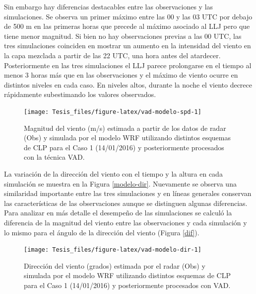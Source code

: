 \documentclass[12pt,spanish,oneside, a4paper]{book}
\begin{document}
Sin embargo hay diferencias destacables entre las observaciones y las
simulaciones. Se observa un primer máximo entre las 00 y las 03 UTC por
debajo de 500 m en las primeras horas que precede al máximo asociado al
LLJ pero que tiene menor magnitud. Si bien no hay observaciones previas
a las 00 UTC, las tres simulaciones coinciden en mostrar un aumento en
la intensidad del viento en la capa mezclada a partir de las 22 UTC, una
hora antes del atardecer. Posteriormente en las tres simulaciones el LLJ
parece prolongarse en el tiempo al menos 3 horas más que en las
observaciones y el máximo de viento ocurre en distintos niveles en cada
caso. En niveles altos, durante la noche el viento decrece rápidamente
subestimando los valores observados.

\begin{figure}

{\centering \texttt{[image: Tesis\_files/figure-latex/vad-modelo-spd-1]} 

}

\caption{Magnitud del viento (m/s) estimada a partir de los datos de radar (Obs) y simulada por el modelo WRF utilizando distintos esquemas de CLP para el Caso 1 (14/01/2016) y posteriormente procesados con la técnica VAD. \label{modelo-spd}}\label{fig:vad-modelo-spd}
\end{figure}

La variación de la dirección del viento con el tiempo y la altura en
cada simulación se muestra en la Figura \ref{modelo-dir}. Nuevamente se
observa una similaridad importante entre las tres simulaciones y en
líneas generales conservan las características de las observaciones
aunque se distinguen algunas diferencias. Para analizar en más detalle
el desempeño de las simulaciones se calculó la diferencia de la magnitud
del viento entre las observaciones y cada simulación y lo mismo para el
ángulo de la dirección del viento (Figura \ref{dif}).

\begin{figure}

{\centering \texttt{[image: Tesis\_files/figure-latex/vad-modelo-dir-1]} 

}

\caption{Dirección del viento (grados) estimada por el radar (Obs) y simulada por el modelo WRF utilizando distintos esquemas de CLP para el Caso 1 (14/01/2016) y posteriormente procesados con VAD. \label{modelo-dir}}\label{fig:vad-modelo-dir}
\end{figure}
\end{document}
